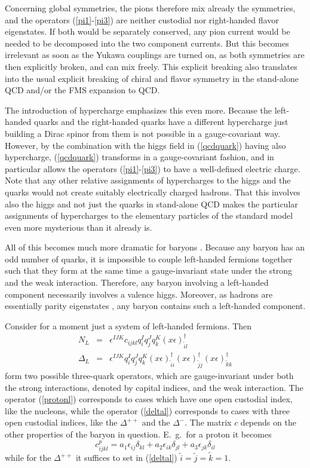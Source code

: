 \documentclass[final,12pt]{article}
\newcommand*{\no}{\noindent}
\newcommand*{\bea}{\begin{eqnarray}}
\newcommand*{\eea}{\end{eqnarray}}
\newcommand*{\be}{\begin{equation}}
\newcommand*{\ee}{\end{equation}}
\newcommand*{\pref}[1]{(\ref{#1})}
\newcommand*{\prefr}[2]{(\ref{#1}-\ref{#2})}
\newcommand*{\nn}{\nonumber}
\newcommand*{\1}{1\!\!\!\bot}
\begin{document}
Concerning global symmetries, the pions therefore mix already the symmetries, and the operators \prefr{pi1}{pi3} are neither custodial nor right-handed flavor eigenstates. If both would be separately conserved, any pion current would be needed to be decomposed into the two component currents. But this becomes irrelevant as soon as the Yukawa couplings are turned on, as both symmetries are then explicitly broken, and can mix freely. This explicit breaking also translates into the usual explicit breaking of chiral and flavor symmetry in the stand-alone QCD and/or the FMS expansion to QCD.

The introduction of hypercharge emphasizes this even more. Because the left-handed quarks and the right-handed quarks have a different hypercharge just building a Dirac spinor from them is not possible in a gauge-covariant way. However, by the combination with the higgs field in \pref{qcdquark} having also hypercharge, \pref{qcdquark} transforms in a gauge-covariant fashion, and in particular allows the operators \prefr{pi1}{pi3} to have a well-defined electric charge. Note that any other relative assignments of hypercharges to the higgs and the quarks would not create suitably electrically charged hadrons. That this involves also the higgs and not just the quarks in stand-alone QCD makes the particular assignments of hypercharges to the elementary particles of the standard model even more mysterious than it already is.

All of this becomes much more dramatic for baryons \cite{Egger:2017tkd}. Because any baryon has an odd number of quarks, it is impossible to couple left-handed fermions together such that they form at the same time a gauge-invariant state under the strong and the weak interaction. Therefore, any baryon involving a left-handed component necessarily involves a valence higgs. Moreover, as hadrons are essentially parity eigenstates \cite{pdg,Gattringer:2010zz,DeGrand:2006zz}, any baryon contains such a left-handed component.

Consider for a moment just a system of left-handed fermions. Then \cite{Egger:2017tkd}
\bea
N_L&=&\epsilon^{IJK} c_{ijkl} q_i^I q_j^J q_k^K (x\epsilon)^{\dagger}_{\tilde{i}l}\label{protonl}\\
\Delta_L&=&\epsilon^{IJK} q_i^I q_j^J q_k^K (x\epsilon)^{\dagger}_{\tilde{i}i} (x\epsilon)^{\dagger}_{\tilde{j}j} (x\epsilon)^{\dagger}_{\tilde{k}k}\label{deltal}
\eea
\no form two possible three-quark operators, which are gauge-invariant under both the strong interactions, denoted by capital indices, and the weak interaction. The operator \pref{protonl} corresponds to cases which have one open custodial index, like the nucleons, while the operator \pref{deltal} corresponds to cases with three open custodial indices, like the $\Delta^{++}$ and the $\Delta^{-}$. The matrix $c$ depends on the other properties of the baryon in question. E.\ g.\ for a proton it becomes \cite{Egger:2017tkd}
\be
c_{ijkl}^p=a_1\epsilon_{ij}\delta_{kl} + a_2\epsilon_{ik}\delta_{jl} + a_3\epsilon_{jk}\delta_{il}\nn
\ee
\no while for the $\Delta^{++}$ it suffices to set in \pref{deltal} $\tilde{i}=\tilde{j}=\tilde{k}=1$.
\end{document}
